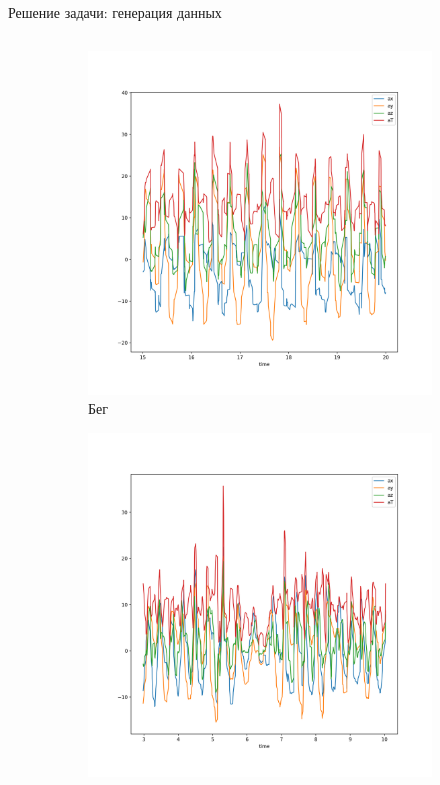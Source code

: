 \documentclass{beamer}
\begin{document}
\begin{frame}{Решение задачи: генерация данных}
\begin{columns}
\begin{column}{\textwidth}
\begin{figure}
\begin{subfigure}[b]{0.25\textwidth}
                    \centering
                    \includegraphics[width=\linewidth]{../pics/raw_run.png}
                    \caption{Бег}
                    \label{fig:sfig2}
                \end{subfigure}
                \begin{subfigure}[b]{0.25\textwidth}
                    \centering
                    \includegraphics[width=\linewidth]{../pics/raw_go_up.png}

\end{subfigure}
\end{figure}
\end{column}
\end{columns}
\end{frame}
\end{document}
